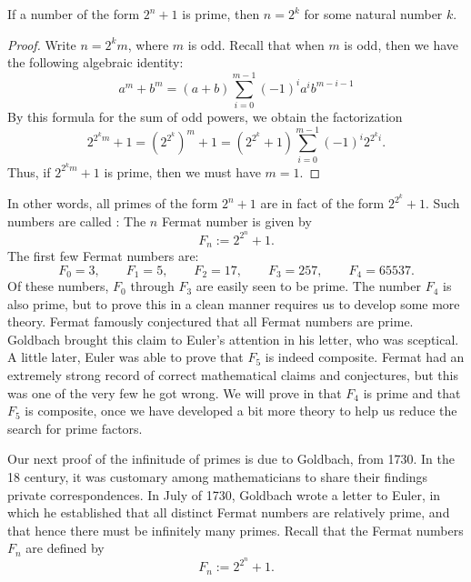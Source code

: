 \begin{theorem}
  If a number of the form $2^n+1$ is prime, then $n=2^k$ for some natural number $k$.
\end{theorem}

\begin{proof}
  Write $n=2^km$, where $m$ is odd. Recall that when $m$ is odd, then we have the following algebraic identity:
  \begin{equation*}
    a^m+b^m=(a+b)\sum_{i=0}^{m-1}(-1)^ia^ib^{m-i-1}
  \end{equation*}
  By this formula for the sum of odd powers, we obtain the factorization
  \begin{equation*}
    2^{2^km}+1=(2^{2^k})^m+1=(2^{2^k}+1)\sum_{i=0}^{m-1} (-1)^i2^{2^k i}.
  \end{equation*}
  Thus, if $2^{2^km}+1$ is prime, then we must have $m=1$.
\end{proof}

In other words, all primes of the form $2^n+1$ are in fact of the form $2^{2^{k}}+1$. Such numbers are called : The $n$\supth{} Fermat number is given by
\begin{equation*}
  F_n:=2^{2^n}+1.
\end{equation*}
The first few Fermat numbers are:
\begin{equation*}
  F_0=3,\qquad F_1=5,\qquad F_2=17,\qquad F_3=257,\qquad F_4=65537.
\end{equation*}
Of these numbers, $F_0$ through $F_3$ are easily seen to be prime. The number $F_4$ is also prime, but to prove this in a clean manner requires us to develop some more theory. Fermat famously conjectured that all Fermat numbers are prime. Goldbach brought this claim to Euler's attention in his letter, who was sceptical. A little later, Euler was able to prove that $F_5$ is indeed composite. Fermat had an extremely strong record of correct mathematical claims and conjectures, but this was one of the very few he got wrong. We will prove in  that $F_4$ is prime and that $F_5$ is composite, once we have developed a bit more theory to help us reduce the search for prime factors.

Our next proof of the infinitude of primes is due to Goldbach, from 1730. In the 18\supth{} century, it was customary among mathematicians to share their findings private correspondences. In July of 1730, Goldbach wrote a letter to Euler, in which he established that all distinct Fermat numbers are relatively prime, and that hence there must be infinitely many primes. Recall that the Fermat numbers $F_n$ are defined by
\begin{equation*}
  F_n := 2^{2^n}+1.
\end{equation*}

